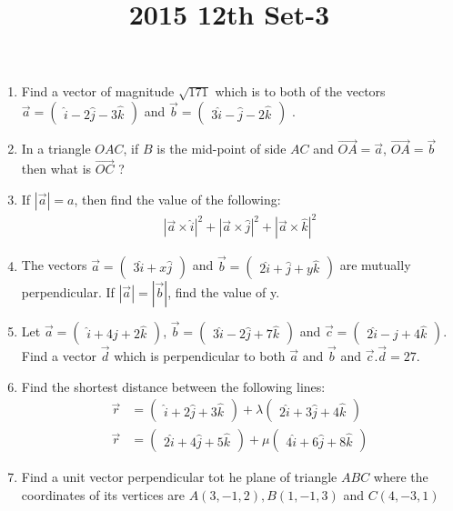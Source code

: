\documentclass[12pt,-letter paper]{article}
\title{2015 12th Set-3}
\newcommand{\myvec}[1]{\ensuremath{\begin{pmatrix}#1\end{pmatrix}}}
\providecommand{\abs}[1]{\left\vert#1\right\vert}
\begin{document}

\begin{enumerate}

\section{Vectors}
	\item Find a vector of magnitude $\sqrt{171}$ which is  to both of the vectors $\overrightarrow{a} = \myvec{\hat{i}-2\hat{j}-3\hat{k}}$ and $\overrightarrow{b} = \myvec{3\hat{i}-\hat{j}-2\hat{k}}$ .
	\item In a triangle $OAC$, if $B$ is the mid-point of side $AC$ and
    $\overrightarrow{OA} = \overrightarrow{a}$, $\overrightarrow{OA} = \overrightarrow{b}$ then what is $\overrightarrow{OC}$ ?
    \item If $\abs{\overrightarrow{a}} = a$, then find the value of the following:
    \begin{align*}
       {\abs{\overrightarrow{a}\times\hat{i}}}^2+{\abs{\overrightarrow{a}\times\hat{j}}}^2+{\abs{\overrightarrow{a}\times\hat{k}}}^2
    \end{align*}
    \item The vectors $\overrightarrow{a} = \myvec{3\hat{i}+x\hat{j}}$ and $\overrightarrow{b} = \myvec{2\hat{i}+\hat{j}+y\hat{k}}$ are mutually perpendicular. If  $\abs{\overrightarrow{a}} = \abs{\overrightarrow{b}}$, find the value of y.
    \item Let $\overrightarrow{a} = \myvec{\hat{i}+4\hat{j}+2\hat{k}}$, $\overrightarrow{b} = \myvec{3\hat{i}-2\hat{j}+7\hat{k}}$ and $\overrightarrow{c} = \myvec{2\hat{i}-\hat{j}+4\hat{k}}$. Find a vector $\overrightarrow{d}$ which is perpendicular to both $\overrightarrow{a}$ and $\overrightarrow{b}$ and $\overrightarrow{c}.\overrightarrow{d} = 27$.
    \item Find the shortest distance between the following lines:
    \begin{align*}
        \overrightarrow{r} &= \myvec{\hat{i}+2\hat{j}+3\hat{k}} + \lambda\myvec{2\hat{i}+3\hat{j}+4\hat{k}}\\
        \overrightarrow{r} &= \myvec{2\hat{i}+4\hat{j}+5\hat{k}} + \mu\myvec{4\hat{i}+6\hat{j}+8\hat{k}}
    \end{align*}
    \item Find a unit vector perpendicular tot he plane of triangle $ABC$ where the coordinates of its vertices are $A(3,-1,2), B(1,-1,3)$ and $C(4,-3,1)$

\end{enumerate}
\end{document}
